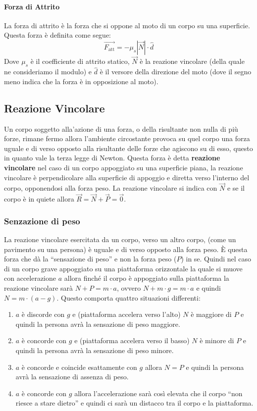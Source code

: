    \paragraph{Forza di Attrito} La forza di attrito è la forza che si oppone al moto di un corpo su una superficie. Questa forza è definita come segue: $$
        \vec{F_{\text{att}}} = -\mu_s|\vec{N}|\cdot \hat{d}
    $$
    Dove $\mu_s$ è il coefficiente di attrito statico, $\vec{N}$ è la reazione vincolare (della quale ne consideriamo il modulo) e $\hat{d}$ è il versore della direzione del moto (dove il segno meno indica che la forza è in opposizione al moto).
    \subsection{Reazione Vincolare}
        Un corpo soggetto alla'azione di una forza, o della risultante non nulla di più forze, rimane fermo allora l'ambiente circostante provoca su quel corpo una forza uguale e di verso opposto alla risultante delle forze che agiscono su di esso, questo in quanto vale la terza legge di Newton. Questa forza è detta \textbf{reazione vincolare} nel caso di un corpo appoggiato su una superficie piana, la reazione vincolare è perpendicolare alla superficie di appoggio e diretta verso l'interno del corpo, opponendosi alla forza peso. La reazione vincolare si indica con $\vec{N}$ e se il corpo è in quiete allora $\vec{R} = \vec{N} + \vec{P} = \vec{0}$.
        \subsubsection{Senzazione di peso} 
            La reazione vincolare esercitata da un corpo, verso un altro corpo, (come un pavimento su una persona) è uguale e di verso opposto alla forza peso. È questa forza che dà la ``sensazione di peso'' e non la forza peso ($P$) in se. Quindi nel caso di un corpo grave appoggiato su una piattaforma orizzontale la quale si muove con accelerazione $a$ allora finché il corpo è appoggiato sulla piattaforma la reazione vincolare sarà $N + P = m\cdot a$, ovvero $N + m\cdot g = m\cdot a$ e quindi $N = m\cdot (a - g)$.\newline
            Questo comporta quattro situazioni differenti:
            \begin{enumerate}
                \item $a$ è discorde con $g$ e (piattaforma accelera verso l'alto) $N$ è maggiore di $P$ e quindi la persona avrà la sensazione di peso maggiore.
                \item $a$ è concorde con $g$ e (piattaforma accelera verso il basso) $N$ è minore di $P$ e quindi la persona avrà la sensazione di peso minore.
                \item $a$ è concorde e coincide esattamente con $g$ allora $N = P$ e quindi la persona avrà la sensazione di assenza di peso.
                \item $a$ è concorde con $g$ allora l'accelerazione sarà così elevata che il corpo ``non riesce a stare dietro'' e quindi ci sarà un distacco tra il corpo e la piattaforma.
            \end{enumerate}

